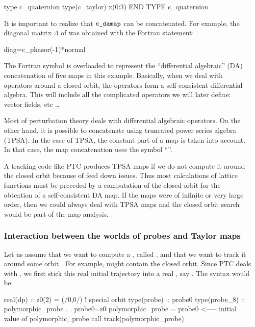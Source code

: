 \documentclass[english,12pt,article]{article} %
\begin{document}
{  \begin{example}
 type  c_quaternion
  type(c_taylor) x(0:3)
END TYPE c_quaternion
      \end{example}

 It is important to realize that  $\vn{c_damap}$ can be concatenated.  For example, the diagonal matrix $\Lambda$ of  was obtained with the Fortran statement:
   \begin{example1}
 diag=c_phasor(-1)*normal%
   \end{example1}

The Fortran symbol \vn{*} is overloaded to represent the ``differential algebraic''  (DA) concatenation of five maps in this example. Basically, when we deal with operators around a closed orbit, the operators form a self-consistent differential algebra. This will include all the complicated operators we will later define: vector fields, etc \ldots

Most of perturbation theory deals with differential algebraic operators. On the other hand, it is possible to concatenate  using truncated power series algebra (TPSA). In the case of TPSA, the constant part of a map is taken into account. In that case, the map concatenation uses the symbol ``''.

A tracking code like PTC produces TPSA maps if we do not compute it around  the closed orbit because of feed down issues.  Thus most calculations of lattice functions must be preceded by a computation of the closed orbit for the obtention of a self-consistent DA map. If the maps were of infinite or very large order, then we could always deal with TPSA maps and the closed orbit search would be part of the map analysis. 

\newpage

  \subsubsection{Interaction between the worlds of probes and   Taylor maps  }
  
  Let us assume that we want to compute a , called  , and that we want to track it around some orbit . For example,  might contain the closed orbit. Since PTC deals with , we first stick this real initial trajectory into a real , say . The syntax would be:
  
    \begin{code}
     real(dp) :: z0(2) = (/0,0/)  ! special orbit
     type(probe) :: probe0 
     type(probe_8) :: polymorphic_probe  
                  .
                  .
      probe0=z0
      polymorphic_probe = probe0    <----- initial value of polymorphic_probe
      call track(polymorphic_probe)
     \end{code}
  
}
\end{document}
